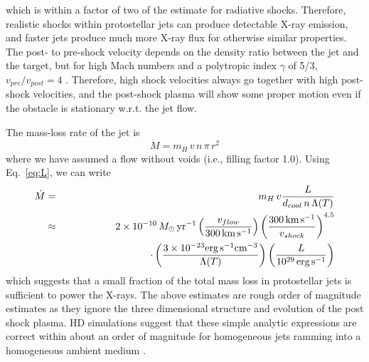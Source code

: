 \documentclass[graybox, nosecnum]{svmult}
\begin{document}
which is within a factor of two of the \citet{Raga_2002} estimate for radiative shocks. Therefore, realistic shocks within protostellar jets can produce detectable X-ray emission, and faster jets produce much more X-ray flux for otherwise similar properties. The post- to pre-shock velocity depends on the density ratio between the jet and the target, but 
for high Mach numbers and a  polytropic index $\gamma$ of 5/3, $v_{pre}/v_{post}=4$ \citep{Draine_1993}. Therefore, high shock velocities always go together with high post-shock velocities, and the post-shock plasma will show some proper motion even if the obstacle is stationary w.r.t. the jet flow.





The mass-loss rate of the jet is 
\begin{equation}
\dot{M} = m_H\,v\,n\,\pi\,r^2
\end{equation}
where we have assumed a flow without voids (i.e., filling factor 1.0). Using Eq.~\ref{eq:L}, 
we can write
\begin{eqnarray}
\dot{M} & = &  m_H\,v \frac{L}{d_{cool}\, n\,\Lambda(T)}\\%
        & \approx & 2\times10^{-10} \,M_\odot\,\textrm{yr}^{-1} \left( \frac{v_{flow}}{300\,\textrm{km}\,\textrm{s}^{-1}} \right) \left( \frac{300\,\textrm{km}\,\textrm{s}^{-1}}{v_{shock}} \right)^{4.5} \nonumber \\
        && \hspace*{3cm}\cdot \left(\frac{3\times10^{-23} \textrm{erg}\, \textrm{s}^{-1} \textrm{cm}^{-3}}{\Lambda(T)}\right)  \left( \frac{L}{10^{29}\,\textrm{erg}\,\textrm{s}^{-1}} \right)
\end{eqnarray}
which suggests that a small fraction of the total mass loss in protostellar jets is sufficient to power the X-rays. 
The above estimates are rough order of magnitude estimates as they ignore the three dimensional structure and evolution of the post shock plasma. HD simulations suggest that these simple analytic expressions are correct within about an order of magnitude for homogeneous jets ramming into a homogeneous ambient medium \cite{Raga_2002}. 
\end{document}
